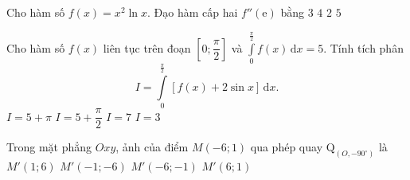 \begin{ex}%
	Cho hàm số $f(x)=x^2 \ln x$. Đạo hàm cấp hai $f''(\mathrm{e})$ bằng
	\choice
	{$3$}
	{$4$}
	{$2$}
	{\True $5$}
\end{ex}
\begin{ex}%
	Cho hàm số $f(x)$ liên tục trên đoạn $ \left[0; \dfrac{\pi}{2} \right]$ và $ \displaystyle \int \limits_0^{\tfrac{\pi}{2}} f(x) \mathrm{\,d}x=5$. Tính tích phân $$I= \displaystyle \int \limits_0^{\tfrac{\pi}{2}} [f(x)+2 \sin x] \mathrm{\,d}x.$$
	\choice
	{$I=5+ \pi $}
	{$I=5+ \dfrac{\pi}{2}$}
	{\True $I=7$}
	{$I=3$}
\end{ex}
\begin{ex}%
	Trong mặt phẳng $Oxy$, ảnh của điểm $M(-6;1)$ qua phép quay $ \mathrm{Q}_{(O,-90^{\circ})}$ là
	\choice
	{\True $M'(1;6)$}
	{$M'(-1;-6)$}
	{$M'(-6;-1)$}
	{$M'(6;1)$}
\end{ex}
